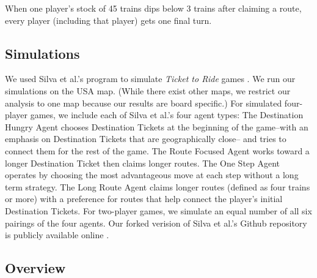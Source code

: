 When one player's stock of 45 trains dips 
below 3 trains after claiming a route,
every player (including that player) gets one final turn.

\subsection{Simulations}
We used Silva et al.'s program to simulate
\textit{Ticket to Ride} games \cite{silva2019}.
We run our simulations on the USA map.
(While there exist other maps, we restrict our analysis
to one map because our results are board specific.)
For simulated four-player games, we include each of 
Silva et al.'s four agent types:
The Destination Hungry Agent chooses 
Destination Tickets at the beginning of the
game--with an emphasis on Destination 
Tickets that are geographically close--
and tries to connect them for the rest of the game.
The Route Focused Agent works toward 
a longer Destination Ticket then claims longer routes.
The One Step Agent operates by choosing 
the most advantageous move at each
step without a long term strategy.
The Long Route Agent claims 
longer routes (defined as four trains or more)
with a preference for routes that help 
connect the player's initial Destination Tickets.
For two-player games, we simulate an equal number 
of all six pairings of the four agents.
Our forked verision of Silva et al.'s
Github repository is publicly available online
\cite{witter2019}.

\subsection{Overview}
